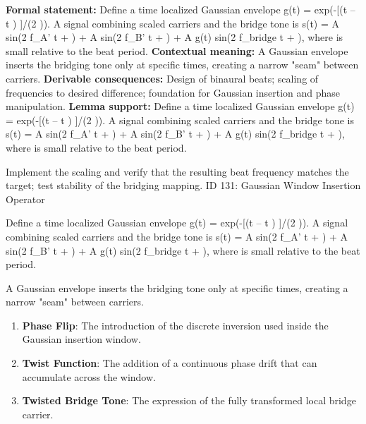 \begingroup\footnotesize\setlength{\emergencystretch}{3em}\sloppy
\textbf{Formal statement:} Define a time localized Gaussian envelope g(t) = exp(-[(t -- t ) ]/(2   )). A signal combining scaled carriers and the bridge tone is s(t) = A  sin(2  f\_A' t +   ) + A  sin(2  f\_B' t +   ) + A  g(t) sin(2  f\_bridge t +   ), where   is small relative to the beat period.
\textbf{Contextual meaning:} A Gaussian envelope inserts the bridging tone only at specific times, creating a narrow "seam" between carriers.
\textbf{Derivable consequences:} Design of binaural beats; scaling of frequencies to desired difference; foundation for Gaussian insertion and phase manipulation.
\textbf{Lemma support:} Define a time localized Gaussian envelope g(t) = exp(-[(t -- t ) ]/(2   )). A signal combining scaled carriers and the bridge tone is s(t) = A  sin(2  f\_A' t +   ) + A  sin(2  f\_B' t +   ) + A  g(t) sin(2  f\_bridge t +   ), where   is small relative to the beat period.\par
\endgroup

Implement the scaling and verify that the resulting beat frequency matches the target; test stability of the bridging mapping. ID 131: Gaussian Window Insertion Operator

Define a time localized Gaussian envelope g(t) = exp(-[(t -- t ) ]/(2   )). A signal combining scaled carriers and the bridge tone is s(t) = A  sin(2  f\_A' t +   ) + A  sin(2  f\_B' t +   ) + A  g(t) sin(2  f\_bridge t +   ), where   is small relative to the beat period.

A Gaussian envelope inserts the bridging tone only at specific times, creating a narrow "seam" between carriers.
\endgroup

\begin{enumerate}[leftmargin=1.6em,itemsep=6pt,topsep=4pt]
\item \textbf{Phase Flip}: The introduction of the discrete inversion used inside the Gaussian insertion window.
\item \textbf{Twist Function}: The addition of a continuous phase drift that can accumulate across the window.
\item \textbf{Twisted Bridge Tone}: The expression of the fully transformed local bridge carrier.
\end{enumerate}

